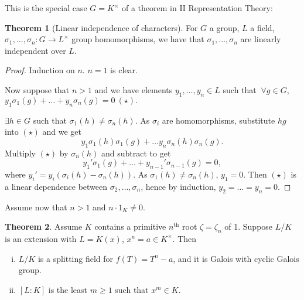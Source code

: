 \documentclass{article}
\theoremstyle{definition}
\newtheorem{theorem}{Theorem}[section]
\begin{document}
This is the special case $G=K^{\times}$ of a theorem in II Representation Theory:
\begin{theorem}[Linear independence of characters]
    For $G$ a group, $L$ a field, $\sigma_1,\ldots,\sigma_n : G \to L^{\times}$ group homomorphisms, we have that $\sigma_1,\ldots,\sigma_n$ are linearly independent over $L$.
\end{theorem}
\begin{proof}
    Induction on $n$. $n=1$ is clear.

    Now suppose that $n>1$ and we have elements $y_1,\ldots,y_n \in L$ such that $~\forall g \in G$, $y_1 \sigma_1(g) + \ldots + y_n \sigma_n(g) = 0 ~(\star).$ 

    $\exists h \in G$ such that $\sigma_1(h) \neq\sigma_n(h)$. As $\sigma_i$ are homomorphisms, substitute $hg$ into $(\star)$ and we get \[
    y_1 \sigma_1(h)\sigma_1(g) + \ldots y_n \sigma_n(h) \sigma_n(g).
    \]
    Multiply $(\star)$ by $\sigma_n(h)$ and subtract to get \[
    y_1' \sigma_1(g) + \ldots + y_{n-1}' \sigma_{n-1}(g) = 0,
    \]
    where $y_i'=y_i(\sigma_i(h)-\sigma_n(h))$. As $\sigma_1(h) \neq \sigma_n(h)$, $y_1=0$. Then $(\star)$ is a linear dependence between $\sigma_2,\ldots,\sigma_n$, hence by induction, $y_2=\ldots=y_n=0$.
\end{proof}
Assume now that $n>1$ and $n\cdot 1_K \neq 0$.
\begin{theorem}\label{12.3}
    Assume $K$ contains a primitive $n^{\text{th}}$ root $\zeta=\zeta_n$ of 1. Suppose $L/K$ is an extension with $L=K(x)$, $x^n=a \in K^{\times}$. Then
    \begin{enumerate}[(i)]
        \item $L/K$ is a splitting field for $f(T)=T^n-a$, and it is Galois with cyclic Galois group.
        \item $[L:K]$ is the least $m\ge 1$ such that $x^m \in K$.
    \end{enumerate}
\end{theorem}
\end{document}
